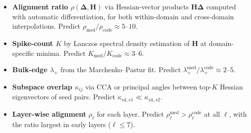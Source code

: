 \documentclass{article}
\newcommand{\Hess}{\mathbf{H}}
\newcommand{\bDelta}{\bm{\Delta}}
\begin{document}
\begin{itemize}
\item \textbf{Alignment ratio $\rho(\bDelta,\Hess)$} via Hessian-vector products
$\Hess\bDelta$ computed with automatic differentiation, for both within-domain and
cross-domain interpolations. Predict $\rho_{\mathrm{med}}/\rho_{\mathrm{code}} \approx 5$--$10$.

\item \textbf{Spike-count $K$} by Lanczos spectral density estimation of $\Hess$ at
domain-specific minima. Predict $K_{\mathrm{med}}/K_{\mathrm{code}} \approx 3$--$6$.

\item \textbf{Bulk-edge $\lambda_+$} from the Marchenko--Pastur fit. Predict
$\lambda_+^{\mathrm{med}}/\lambda_+^{\mathrm{code}} \approx 2$--$5$.

\item \textbf{Subspace overlap $\kappa_{ij}$} via CCA or principal angles between
top-$K$ Hessian eigenvectors of seed pairs. Predict $\kappa_{s4,s1}\ll\kappa_{s4,s2}$.

\item \textbf{Layer-wise alignment} $\rho_\ell$ for each layer. Predict
$\rho_\ell^{\mathrm{med}}>\rho_\ell^{\mathrm{code}}$ at all $\ell$, with the
ratio largest in early layers ($\ell\leq7$).
\end{itemize}
\end{document}

